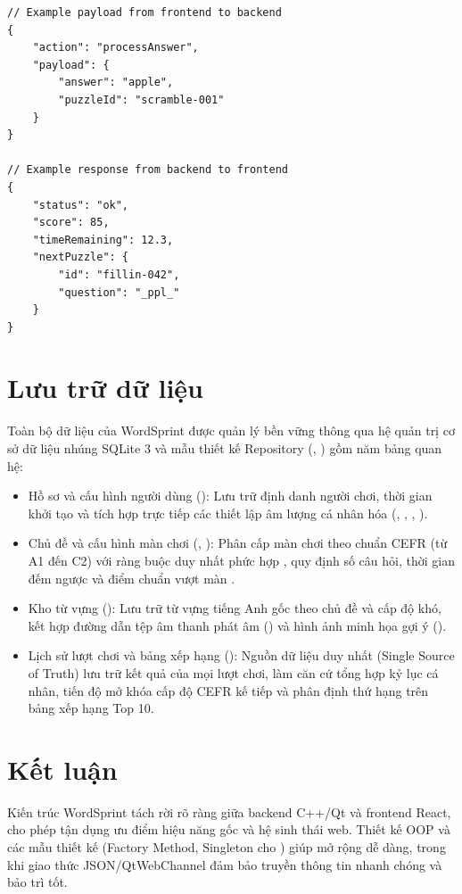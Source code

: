 \begin{lstlisting}
// Example payload from frontend to backend
{
    "action": "processAnswer",
    "payload": {
        "answer": "apple",
        "puzzleId": "scramble-001"
    }
}

// Example response from backend to frontend
{
    "status": "ok",
    "score": 85,
    "timeRemaining": 12.3,
    "nextPuzzle": {
        "id": "fillin-042",
        "question": "_ppl_"
    }
}
\end{lstlisting}

\section{Lưu trữ dữ liệu}
\label{sec:data_storage}
Toàn bộ dữ liệu của WordSprint được quản lý bền vững thông qua hệ quản trị cơ sở dữ liệu nhúng SQLite 3 và mẫu thiết kế Repository (, ) gồm năm bảng quan hệ:
\begin{itemize}
    \item Hồ sơ và cấu hình người dùng (): Lưu trữ định danh người chơi, thời gian khởi tạo và tích hợp trực tiếp các thiết lập âm lượng cá nhân hóa (, , , ).
    \item Chủ đề và cấu hình màn chơi (, ): Phân cấp màn chơi theo chuẩn CEFR (từ A1 đến C2) với ràng buộc duy nhất phức hợp , quy định số câu hỏi, thời gian đếm ngược và điểm chuẩn vượt màn .
    \item Kho từ vựng (): Lưu trữ từ vựng tiếng Anh gốc theo chủ đề và cấp độ khó, kết hợp đường dẫn tệp âm thanh phát âm () và hình ảnh minh họa gợi ý ().
    \item Lịch sử lượt chơi và bảng xếp hạng (): Nguồn dữ liệu duy nhất (Single Source of Truth) lưu trữ kết quả của mọi lượt chơi, làm căn cứ tổng hợp kỷ lục cá nhân, tiến độ mở khóa cấp độ CEFR kế tiếp và phân định thứ hạng trên bảng xếp hạng Top 10.
\end{itemize}

\section{Kết luận}
\label{sec:architecture_conclusion}
Kiến trúc WordSprint tách rời rõ ràng giữa backend C++/Qt và frontend React, cho phép tận dụng ưu điểm hiệu năng gốc và hệ sinh thái web. Thiết kế OOP và các mẫu thiết kế (Factory Method, Singleton cho ) giúp mở rộng dễ dàng, trong khi giao thức JSON/QtWebChannel đảm bảo truyền thông tin nhanh chóng và bảo trì tốt.